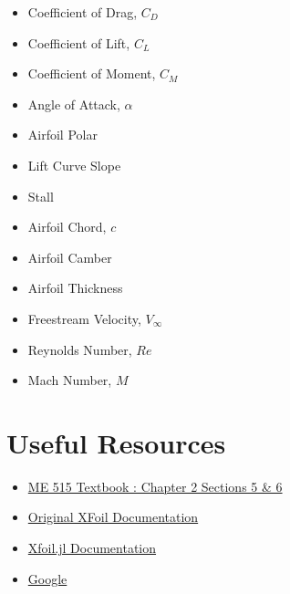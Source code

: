 \documentclass[12pt]{article}
\begin{document}
\begin{multicols}{2}
	\begin{itemize}
		\item Coefficient of Drag, $C_D$
		\item Coefficient of Lift, $C_L$
		\item Coefficient of Moment, $C_M$
		\item Angle of Attack, $\alpha$
		\item Airfoil Polar
		\item Lift Curve Slope
		\item Stall
		\item Airfoil Chord, $c$
		\item Airfoil Camber
		\item Airfoil Thickness
		\item Freestream Velocity, $V_\infty$
		\item Reynolds Number, $Re$
		\item Mach Number, $M$
	\end{itemize}
\end{multicols}


\section{Useful Resources}
\begin{itemize}
 	\item \href{https://byu.box.com/shared/static/ywfayozbj3sr2ot6b32u8nqk5brqvurt.pdf}{ME 515 Textbook : Chapter 2 Sections 5 \& 6}
 	\item \href{http://web.mit.edu/drela/Public/web/xfoil/xfoil_doc.txt}{Original XFoil Documentation}
  		\item \href{https://flow.byu.edu/Xfoil.jl/stable/}{Xfoil.jl Documentation}
  		\item \href{https://www.google.com/}{Google}
\end{itemize}
\end{document}
